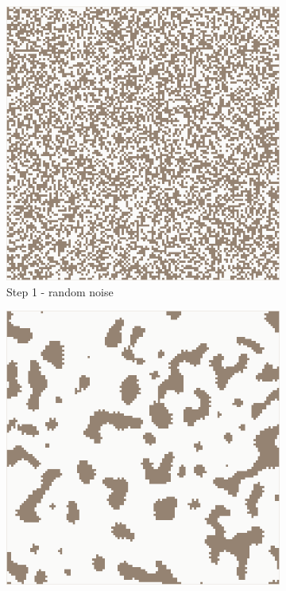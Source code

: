 \documentclass[12pt]{report}
\begin{document}
\begin{figure}[h]
	\centering
	\begin{subfigure}[b]{0.2\textwidth}
		\centering
		\includegraphics[width=\textwidth]{images/step1}
		\caption{Step 1 - random noise} 
	\end{subfigure}
	\hfill
	\begin{subfigure}[b]{0.2\textwidth}
		\centering
		\includegraphics[width=\textwidth]{images/step2}

\end{subfigure}
\end{figure}
\end{document}
